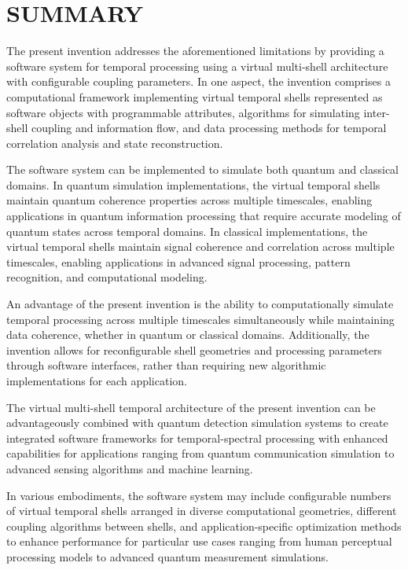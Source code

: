 \documentclass[12pt,letterpaper]{article}
\begin{document}
\section*{SUMMARY}

The present invention addresses the aforementioned limitations by providing a software system for temporal processing using a virtual multi-shell architecture with configurable coupling parameters. In one aspect, the invention comprises a computational framework implementing virtual temporal shells represented as software objects with programmable attributes, algorithms for simulating inter-shell coupling and information flow, and data processing methods for temporal correlation analysis and state reconstruction.

The software system can be implemented to simulate both quantum and classical domains. In quantum simulation implementations, the virtual temporal shells maintain quantum coherence properties across multiple timescales, enabling applications in quantum information processing that require accurate modeling of quantum states across temporal domains. In classical implementations, the virtual temporal shells maintain signal coherence and correlation across multiple timescales, enabling applications in advanced signal processing, pattern recognition, and computational modeling.

An advantage of the present invention is the ability to computationally simulate temporal processing across multiple timescales simultaneously while maintaining data coherence, whether in quantum or classical domains. Additionally, the invention allows for reconfigurable shell geometries and processing parameters through software interfaces, rather than requiring new algorithmic implementations for each application.

The virtual multi-shell temporal architecture of the present invention can be advantageously combined with quantum detection simulation systems to create integrated software frameworks for temporal-spectral processing with enhanced capabilities for applications ranging from quantum communication simulation to advanced sensing algorithms and machine learning.

In various embodiments, the software system may include configurable numbers of virtual temporal shells arranged in diverse computational geometries, different coupling algorithms between shells, and application-specific optimization methods to enhance performance for particular use cases ranging from human perceptual processing models to advanced quantum measurement simulations.
\end{document}
